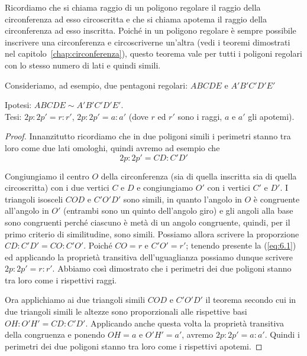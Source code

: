 Ricordiamo che si chiama raggio di un poligono regolare il raggio della circonferenza ad esso circoscritta e che si chiama apotema il raggio della circonferenza ad esso inscritta. Poiché in un poligono regolare è sempre possibile inscrivere una circonferenza e circoscriverne un'altra (vedi i teoremi dimostrati nel capitolo~\ref{chap:circonferenza}), questo teorema vale per tutti i poligoni regolari con lo stesso numero di lati e quindi simili.

Consideriamo, ad esempio, due pentagoni regolari: $ABCDE$ e $A'B'C'D'E'$

\noindent Ipotesi: $ABCDE\sim A'B'C'D'E'$.\\
Tesi: $2p : 2p' = r : r'$, $2p : 2p' = a : a'$ (dove $r$ ed $r'$ sono i raggi, $a$ e $a'$ gli apotemi).

\begin{figure*}[!htb]
	\centering
\end{figure*}

\begin{proof}
Innanzitutto ricordiamo che in due poligoni simili i perimetri stanno tra loro come due lati omologhi, quindi avremo ad esempio che
\begin{equation}\label{eq:6.1}
2p : 2p' = CD : C'D'
\end{equation}

Congiungiamo il centro $O$ della circonferenza (sia di quella inscritta sia di quella circoscritta) con i due vertici $C$ e $D$ e congiungiamo $O'$ con i vertici $C'$ e $D'$. I triangoli isosceli $COD$ e $C'O'D'$ sono simili, in quanto l'angolo in $O$ è congruente all'angolo in $O'$ (entrambi sono un quinto dell'angolo giro) e gli angoli alla base sono congruenti perché ciascuno è metà di un angolo congruente, quindi, per il primo criterio di similitudine, sono simili. Possiamo allora scrivere la proporzione $CD : C'D' = CO : C'O'$.
Poiché $CO = r$ e $C'O' = r'$; tenendo presente la (\ref{eq:6.1}) ed applicando la proprietà transitiva dell'uguaglianza possiamo dunque scrivere $2p : 2p' = r : r'$. Abbiamo così dimostrato che i perimetri dei due poligoni stanno tra loro come i rispettivi raggi.

Ora applichiamo ai due triangoli simili $COD$ e $C'O'D'$ il teorema secondo cui in due triangoli simili le altezze sono proporzionali alle rispettive basi $OH : O'H' = CD : C'D'$. Applicando anche questa volta la proprietà transitiva della congruenza e ponendo $OH = a$ e $O'H' =a'$, avremo $2p : 2p' = a : a'$.
Quindi i perimetri dei due poligoni stanno tra loro come i rispettivi apotemi.
\end{proof}

